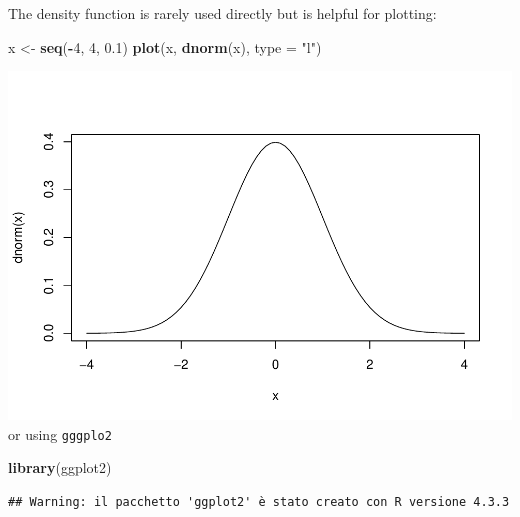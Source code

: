 \documentclass[
]{article}
\newenvironment{Shaded}{\begin{snugshade}}{\end{snugshade}}
\newcommand{\AttributeTok}[1]{\textcolor[rgb]{0.13,0.29,0.53}{#1}}
\newcommand{\DecValTok}[1]{\textcolor[rgb]{0.00,0.00,0.81}{#1}}
\newcommand{\FloatTok}[1]{\textcolor[rgb]{0.00,0.00,0.81}{#1}}
\newcommand{\FunctionTok}[1]{\textcolor[rgb]{0.13,0.29,0.53}{\textbf{#1}}}
\newcommand{\NormalTok}[1]{#1}
\newcommand{\OtherTok}[1]{\textcolor[rgb]{0.56,0.35,0.01}{#1}}
\newcommand{\SpecialCharTok}[1]{\textcolor[rgb]{0.81,0.36,0.00}{\textbf{#1}}}
\newcommand{\StringTok}[1]{\textcolor[rgb]{0.31,0.60,0.02}{#1}}
\begin{document}
The density function is rarely used directly but is helpful for
plotting:

\begin{Shaded}
\begin{Highlighting}[]
\NormalTok{x }\OtherTok{\textless{}{-}} \FunctionTok{seq}\NormalTok{(}\SpecialCharTok{{-}}\DecValTok{4}\NormalTok{, }\DecValTok{4}\NormalTok{, }\FloatTok{0.1}\NormalTok{)}
\FunctionTok{plot}\NormalTok{(x, }\FunctionTok{dnorm}\NormalTok{(x), }\AttributeTok{type =} \StringTok{"l"}\NormalTok{)}
\end{Highlighting}
\end{Shaded}

\includegraphics{Probability-Distributions_files/figure-latex/unnamed-chunk-7-1.pdf}
or using \texttt{gggplo2}

\begin{Shaded}
\begin{Highlighting}[]
\FunctionTok{library}\NormalTok{(ggplot2)}
\end{Highlighting}
\end{Shaded}

\begin{verbatim}
## Warning: il pacchetto 'ggplot2' è stato creato con R versione 4.3.3
\end{verbatim}
\end{document}
